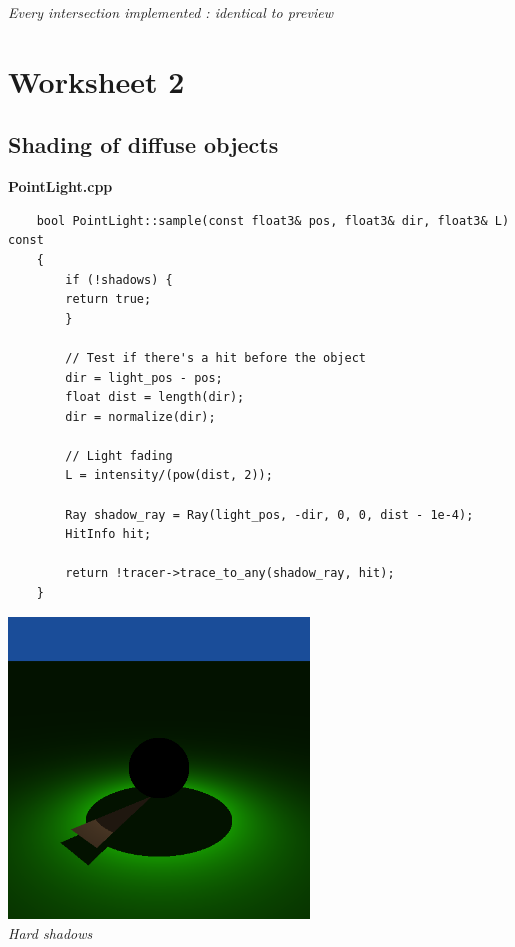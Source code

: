 \documentclass[a4,12pt]{article}
\begin{document}
\begin{center}
\begin{minipage}[b]{0.40\linewidth}
\begin{center}
			\textit{Every intersection implemented : identical to preview}
		\end{center}
	\end{minipage}
	\end{center}

	
	\section{Worksheet 2}
	
	\subsection{Shading of diffuse objects}
	\textbf{PointLight.cpp}
	\begin{lstlisting}
	bool PointLight::sample(const float3& pos, float3& dir, float3& L) const
	{
		if (!shadows) {
		return true;
		}
		
		// Test if there's a hit before the object
		dir = light_pos - pos;
		float dist = length(dir);
		dir = normalize(dir);
		
		// Light fading
		L = intensity/(pow(dist, 2));
		
		Ray shadow_ray = Ray(light_pos, -dir, 0, 0, dist - 1e-4);
		HitInfo hit;
		
		return !tracer->trace_to_any(shadow_ray, hit);
	}
	\end{lstlisting}
	
	\begin{center}
		\includegraphics[width =8cm]{./Worksheet2/hard_shadows.png}\\
		\textit{Hard shadows}
	\end{center}
	
\end{document}
